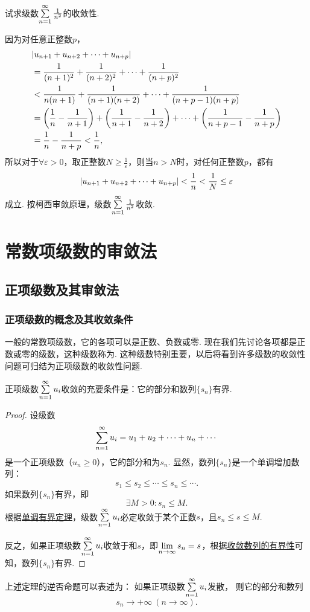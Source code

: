 \begin{example}
试求级数\(\sum\limits_{n=1}^\infty \frac{1}{n^2}\)的收敛性.
\begin{solution}
因为对任意正整数\(p\)，\begin{align*}
&\abs{u_{n+1}+u_{n+2}+\dotsb+u_{n+p}} \\
&=\frac{1}{(n+1)^2}+\frac{1}{(n+2)^2}+\dotsb+\frac{1}{(n+p)^2} \\
&<\frac{1}{n(n+1)}+\frac{1}{(n+1)(n+2)}+\dotsb+\frac{1}{(n+p-1)(n+p)} \\
&=\left(\frac{1}{n}-\frac{1}{n+1}\right)+\left(\frac{1}{n+1}-\frac{1}{n+2}\right)+\dotsb+\left(\frac{1}{n+p-1}-\frac{1}{n+p}\right) \\
&=\frac{1}{n}-\frac{1}{n+p} < \frac{1}{n},
\end{align*}
所以对于\(\forall \varepsilon > 0\)，取正整数\(N \geq \frac{1}{\varepsilon}\)，则当\(n > N\)时，对任何正整数\(p\)，都有\[
\abs{u_{n+1}+u_{n+2}+\dotsb+u_{n+p}}
< \frac{1}{n}
< \frac{1}{N}
\leq \varepsilon
\]成立.
按柯西审敛原理，级数\(\sum\limits_{n=1}^\infty \frac{1}{n^2}\)收敛.
\end{solution}
\end{example}

\section{常数项级数的审敛法}
\subsection{正项级数及其审敛法}
\subsubsection{正项级数的概念及其收敛条件}
一般的常数项级数，它的各项可以是正数、负数或零.
现在我们先讨论各项都是正数或零的级数，这种级数称为.
这种级数特别重要，以后将看到许多级数的收敛性问题可归结为正项级数的收敛性问题.

\begin{theorem}\label{theorem:无穷级数.正项级数收敛的充要条件}
正项级数\(\sum\limits_{n=1}^\infty u_i\)收敛的充要条件是：它的部分和数列\(\{s_n\}\)有界.
\begin{proof}
设级数\[
\sum\limits_{n=1}^\infty u_i = u_1 + u_2 + \dotsb + u_n + \dotsb
\]是一个正项级数（\(u_n \geq 0\)），它的部分和为\(s_n\).
显然，数列\(\{s_n\}\)是一个单调增加数列：\[
s_1 \leq s_2 \leq \dotsb \leq s_n \leq \dotsb.
\]如果数列\(\{s_n\}\)有界，即\[
\exists M>0 : s_n \leq M.
\]根据\hyperref[theorem:极限.数列的单调有界定理]{单调有界定理}，级数\(\sum\limits_{n=1}^\infty u_i\)必定收敛于某个正数\(s\)，且\(s_n \leq s \leq M\).

反之，如果正项级数\(\sum\limits_{n=1}^\infty u_i\)收敛于和\(s\)，即\(\lim\limits_{n\to\infty} s_n = s\)，根据\hyperref[theorem:极限.收敛数列的有界性]{收敛数列的有界性}可知，数列\(\{s_n\}\)有界.
\end{proof}
\end{theorem}
上述定理的逆否命题可以表述为：
如果正项级数\(\sum\limits_{n=1}^\infty u_i\)发散，%
则它的部分和数列
\[
s_n \to +\infty\ (n\to\infty).
\]

